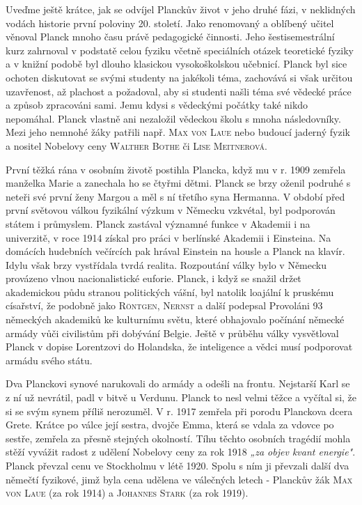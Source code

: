         Uveďme ještě krátce, jak se odvíjel Planckův život v jeho druhé fázi, v neklidných vodách
        historie první poloviny 20. století. Jako renomovaný a oblíbený učitel věnoval Planck mnoho
        času právě pedagogické činnosti. Jeho šestisemestrální kurz zahrnoval v podstatě celou
        fyziku včetně speciálních otázek teoretické fyziky a v knižní podobě byl dlouho klasickou
        vysokoškolskou učebnicí. Planck byl sice ochoten diskutovat se svými studenty na jakékoli
        téma, zachovává si však určitou uzavřenost, až plachost a požadoval, aby si studenti našli
        téma své vědecké práce a způsob zpracováni sami. Jemu kdysi s vědeckými počátky také nikdo
        nepomáhal. Planck vlastně ani nezaložil vědeckou školu s mnoha následovníky. Mezi jeho
        nemnohé žáky patřili např. \textsc{Max von Laue} nebo budoucí jaderný fyzik a nositel
        Nobelovy ceny \textsc{Walther Bothe} či \textsc{Lise Meitnerová}.

        První těžká rána v osobním životě postihla Plancka, když mu v r. 1909 zemřela manželka Marie
        a zanechala ho se čtyřmi dětmi. Planck se brzy oženil podruhé s neteři své první ženy Margou
        a měl s ní třetího syna Hermanna. V období před první světovou válkou fyzikální výzkum v
        Německu vzkvétal, byl podporován státem i průmyslem. Planck zastával významné funkce v
        Akademii i na univerzitě, v roce 1914 získal pro práci v berlínské Akademii i Einsteina. Na
        domácích hudebních večírcích pak hrával Einstein na housle a Planck na klavír. Idylu však
        brzy vystřídala tvrdá realita. Rozpoutání války bylo v Německu provázeno vlnou
        nacionalistické euforie. Planck, i když se snažil držet akademickou půdu stranou politických
        vášní, byl natolik loajální k pruskému císařství, že podobně jako \textsc{Röntgen},
        \textsc{Nernst} a další podepsal Provoláni 93 německých akademiků ke kulturnímu světu, které
        obhajovalo počínání německé armády vůči civilistům při dobývání Belgie. Ještě v průběhu
        války vysvětloval Planck v dopise Lorentzovi do Holandska, že inteligence a vědci musí
        podporovat armádu svého státu.

        Dva Planckovi synové narukovali do armády a odešli na frontu. Nejstarší Karl se z ní už
        nevrátil, padl v bitvě u Verdunu. Planck to nesl velmi těžce a vyčítal si, že si se svým
        synem příliš nerozuměl. V r. 1917 zemřela při porodu Planckova dcera Grete. Krátce po válce
        její sestra, dvojče Emma, která se vdala za vdovce po sestře, zemřela za přesně stejných
        okolností. Tíhu těchto osobních tragédií mohla stěží vyvážit radost z udělení Nobelovy ceny
        za rok 1918 \emph{„za objev kvant energie"}. Planck převzal cenu ve Stockholmu v létě 1920.
        Spolu s ním ji převzali další dva němečtí fyzikové, jimž byla cena udělena ve válečných
        letech - Planckův žák \textsc{Max von Laue} (za rok 1914) a \textsc{Johannes Stark} (za rok
        1919).

